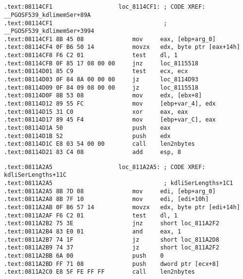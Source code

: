 \chapter{}
\label{anomaly:Intel}
\index{\CompilerAnomaly}
\index{\oracle}


\begin{lstlisting}[caption=\RU{kdli.o из}\EN{kdli.o from} libserver11.a]
.text:08114CF1                   loc_8114CF1: ; CODE XREF: __PGOSF539_kdlimemSer+89A
.text:08114CF1                                ; __PGOSF539_kdlimemSer+3994
.text:08114CF1 8B 45 08              mov     eax, [ebp+arg_0]
.text:08114CF4 0F B6 50 14           movzx   edx, byte ptr [eax+14h]
.text:08114CF8 F6 C2 01              test    dl, 1
.text:08114CFB 0F 85 17 08 00 00     jnz     loc_8115518
.text:08114D01 85 C9                 test    ecx, ecx
.text:08114D03 0F 84 8A 00 00 00     jz      loc_8114D93
.text:08114D09 0F 84 09 08 00 00     jz      loc_8115518
.text:08114D0F 8B 53 08              mov     edx, [ebx+8]
.text:08114D12 89 55 FC              mov     [ebp+var_4], edx
.text:08114D15 31 C0                 xor     eax, eax
.text:08114D17 89 45 F4              mov     [ebp+var_C], eax
.text:08114D1A 50                    push    eax
.text:08114D1B 52                    push    edx
.text:08114D1C E8 03 54 00 00        call    len2nbytes
.text:08114D21 83 C4 08              add     esp, 8
\end{lstlisting}

\begin{lstlisting}[caption=\RU{оттуда же}\EN{from the same code}]
.text:0811A2A5                   loc_811A2A5: ; CODE XREF: kdliSerLengths+11C
.text:0811A2A5                                ; kdliSerLengths+1C1
.text:0811A2A5 8B 7D 08              mov     edi, [ebp+arg_0]
.text:0811A2A8 8B 7F 10              mov     edi, [edi+10h]
.text:0811A2AB 0F B6 57 14           movzx   edx, byte ptr [edi+14h]
.text:0811A2AF F6 C2 01              test    dl, 1
.text:0811A2B2 75 3E                 jnz     short loc_811A2F2
.text:0811A2B4 83 E0 01              and     eax, 1
.text:0811A2B7 74 1F                 jz      short loc_811A2D8
.text:0811A2B9 74 37                 jz      short loc_811A2F2
.text:0811A2BB 6A 00                 push    0
.text:0811A2BD FF 71 08              push    dword ptr [ecx+8]
.text:0811A2C0 E8 5F FE FF FF        call    len2nbytes
\end{lstlisting}

